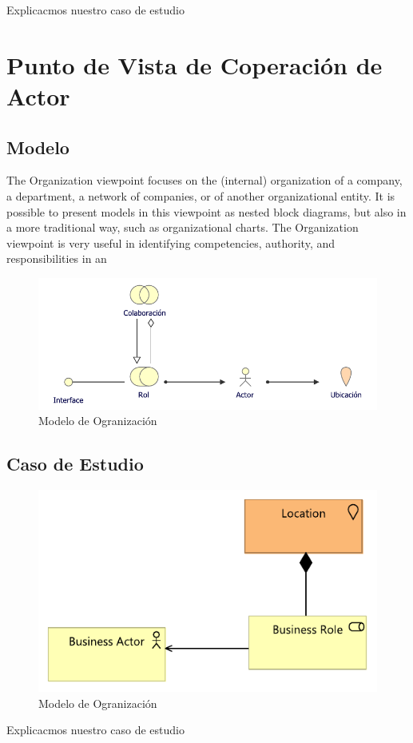  Explicacmos nuestro caso de estudio
\newpage
\section{Punto de Vista de Coperación de Actor}
\subsection{Modelo}
The Organization viewpoint focuses on the (internal) organization of a company, a department, a network of companies, or of another organizational entity. It is possible to present models in this viewpoint as nested block diagrams, but also in a more traditional way, such as organizational charts. The Organization viewpoint is very useful in identifying competencies, authority, and responsibilities in an

\begin{figure}[h!]
	\centering
	\includegraphics[width=1\linewidth]{ARQUITECTURA/imgs/MOrganizacion}
	\caption{Modelo de Ogranización}
\end{figure}


\newpage
\subsection{Caso de Estudio}

\begin{figure}[h!]
	\centering
	\includegraphics[width=.5\linewidth]{ARQUITECTURA/imgs/COrganizacion1}
	\caption{Modelo de Ogranización}
\end{figure}
Explicacmos nuestro caso de estudio
\newpage
